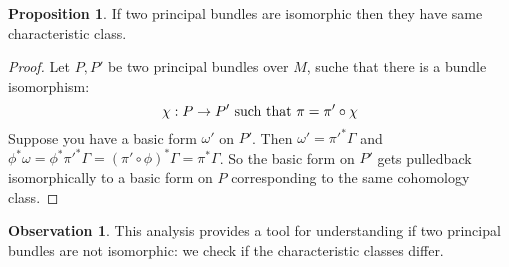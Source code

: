 \documentclass[12pt,a4paper]{report}
\theoremstyle{definition}
\theoremstyle{Theorem}
\newtheorem{Prop}[Def]{Proposition}
\theoremstyle{definition}
\theoremstyle{definition}
\newtheorem{Obs}[Def]{Observation}
\begin{document}
		\begin{Prop}
			If two principal bundles are isomorphic then they have same characteristic class.
		\end{Prop}
		\begin{proof}
			Let $P,P'$ be two principal bundles over $M$, suche that there is a bundle isomorphism:
			$$\chi:P\rightarrow P'\hbox{ such that }\pi=\pi'\circ \chi$$
			Suppose you have a basic form $\omega'$ on $P'$. Then $\omega'=\pi'^*\Gamma$ and $\phi^*\omega=\phi^*\pi'^*\Gamma=(\pi'\circ \phi)^*\Gamma=\pi^*\Gamma$. So the basic form on $P'$ gets pulledback isomorphically to a basic form on $P$ corresponding to the same cohomology class.
		\end{proof}
		\begin{Obs}
			This analysis provides a tool for understanding if two principal bundles are not isomorphic: we check if the characteristic classes differ. 
		\end{Obs}
\end{document}
